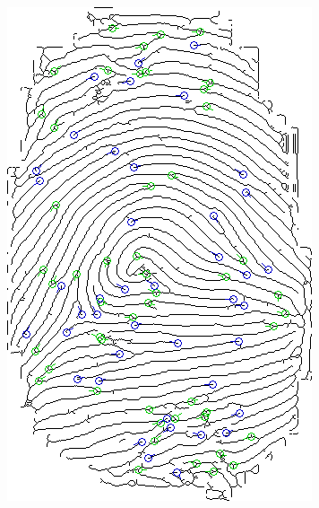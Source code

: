 \documentclass[8pt]{article}
\begin{document}
\begin{figure}
\centering
\begin{minipage}{.5\textwidth}
  \centering
  \includegraphics[width=.75\linewidth]{img/skemin}
  \label{fig:skemin}
\end{minipage}%
\begin{minipage}{.5\textwidth}
  \centering

\end{minipage}
\end{figure}
\end{document}

